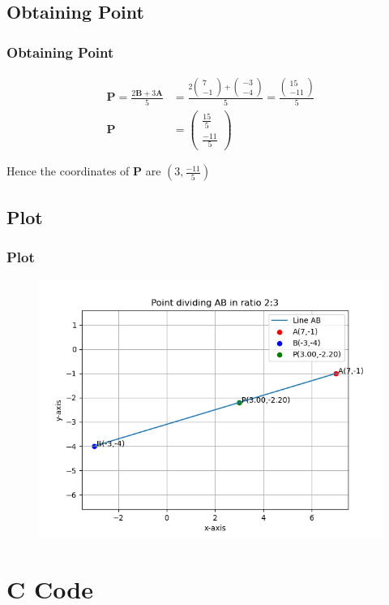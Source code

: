 \documentclass{beamer}
\providecommand{\brak}[1]{\ensuremath{\left(#1\right)}}
\theoremstyle{remark}
\newcommand{\myvec}[1]{\ensuremath{\begin{pmatrix}#1\end{pmatrix}}}
\let\vec\mathbf
\numberwithin{equation}{section}
\begin{document}
\subsection{Obtaining Point}
\begin{frame}
\frametitle{Obtaining Point}

\begin{align}
\vec{P}=\frac{2\vec{B}+3\vec{A}}{5}&=\frac{2\myvec{7\\-1}+\myvec{-3\\-4}}{5}=\frac{\myvec{15\\-11}}{5} \\
\vec{P}
&=\myvec{\frac{15}{5}\\\frac{-11}{5}}
\end{align}

Hence the coordinates of $\vec{P}$ are $\brak{3,\frac{-11}{5}}$


\end{frame}

\subsection{Plot}
\begin{frame}[fragile]
\frametitle{Plot}

\begin{figure}[h!]
   \centering
   \includegraphics[width=0.9\linewidth]{figs/plot.png}
	\caption{}
   \label{stemplot}
\end{figure}
\end{frame}

\section{C Code}
\end{document}
